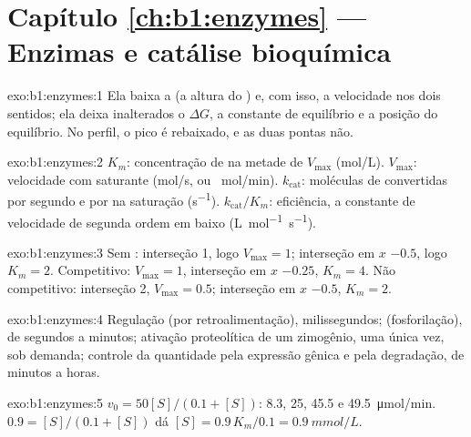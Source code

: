 \section*{Capítulo \ref{ch:b1:enzymes} --- Enzimas e catálise bioquímica}

\begin{solution}{exo:b1:enzymes:1}
Ela baixa a  (a altura do ) e, com
isso, a velocidade nos dois sentidos; ela deixa inalterados o
$\Delta G$, a constante de equilíbrio e a posição do equilíbrio. No
perfil, o pico é rebaixado, e as duas pontas não.
\end{solution}

\begin{solution}{exo:b1:enzymes:2}
$K_m$: concentração de  na metade de $V_{\max}$
(\unit{mol/L}). $V_{\max}$: velocidade com  saturante
(\unit{mol/s}, ou \unit{\micro
mol/min}). $k_{\text{cat}}$: moléculas de  convertidas por
segundo e por  na saturação (\unit{s^{-1}}).
$k_{\text{cat}}/K_m$: eficiência, a constante de velocidade de segunda
ordem em  baixo (\unit{L.mol^{-1}.s^{-1}}).
\end{solution}

\begin{solution}{exo:b1:enzymes:3}
Sem : interseção 1, logo $V_{\max} = 1$; interseção em $x$
$-0.5$, logo $K_m = 2$. Competitivo: $V_{\max} = 1$, interseção em $x$
$-0.25$, $K_m = 4$. Não competitivo: interseção 2, $V_{\max} = 0.5$;
interseção em $x$ $-0.5$, $K_m = 2$.
\end{solution}

\begin{solution}{exo:b1:enzymes:4}
Regulação  (por retroalimentação), milissegundos;  (fosforilação), de segundos a minutos; ativação proteolítica
de um zimogênio, uma única vez, sob demanda; controle da quantidade pela
expressão gênica e pela degradação, de minutos a horas.
\end{solution}

\begin{solution}{exo:b1:enzymes:5}
$v_0 = 50[S]/(0.1 + [S])$: 8.3, 25, 45.5 e \qty{49.5}{\micro mol/min}.
$0.9 = [S]/(0.1 + [S])$ dá $[S] = 0.9\,K_m/0.1 = \qty{0.9}{mmol/L}$.
\end{solution}

